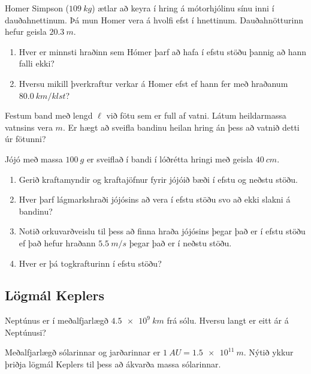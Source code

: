 \ifdefined \wholebook \else\documentclass[oneside]{book}\usepackage{EdlBook}\graphicspath{{figures/}}
\begin{document}
\begin{enumerate}[label = \textbf{Dæmi \thechapter.\arabic*.}]
\begin{minipage}{\linewidth}
\item Homer Simpson ($\SI{109}{kg}$) ætlar að keyra í hring á mótorhjólinu sínu inni í dauðahnettinum. Þá mun Homer vera á hvolfi efst í hnettinum. Dauðahnötturinn hefur geisla $\SI{20.3}{m}$.
\begin{enumerate}[label = \textbf{(\alph*})]
    \item Hver er minnsti hraðinn sem Hómer þarf að hafa í efstu stöðu þannig að hann falli ekki?
    
    \item Hversu mikill þverkraftur verkar á Homer efst ef hann fer með hraðanum $\SI{80.0}{km/klst}$?
\end{enumerate}

\end{minipage}

\item Festum band með lengd $\ell$ við fötu sem er full af vatni. Látum heildarmassa vatnsins vera $m$. Er hægt að sveifla bandinu heilan hring án þess að vatnið detti úr fötunni?

\item Jójó með massa $\SI{100}{g}$ er sveiflað í bandi í lóðrétta hringi með geisla $\SI{40}{cm}$.
\begin{enumerate}[label = \textbf{(\alph*)}]
    \item Gerið kraftamyndir og kraftajöfnur fyrir jójóið bæði í efstu og neðstu stöðu.
    \item Hver þarf lágmarkshraði jójósins að vera í efstu stöðu svo að ekki slakni á bandinu?
    \item Notið orkuvarðveislu til þess að finna hraða jójósins þegar það er í efstu stöðu ef það hefur hraðann $\SI{5.5}{m/s}$ þegar það er í neðstu stöðu.
    \item Hver er þá togkrafturinn í efstu stöðu?
\end{enumerate}

\subsection*{Lögmál Keplers}

\item Neptúnus er í meðalfjarlægð $\SI{4.5e9}{km}$ frá sólu. Hversu langt er eitt ár á Neptúnusi?

\item Meðalfjarlægð sólarinnar og jarðarinnar er $\SI{1}{AU} = \SI{1.5e11}{m}$. Nýtið ykkur þriðja lögmál Keplers til þess að ákvarða massa sólarinnar.


\end{enumerate}
\end{document}
